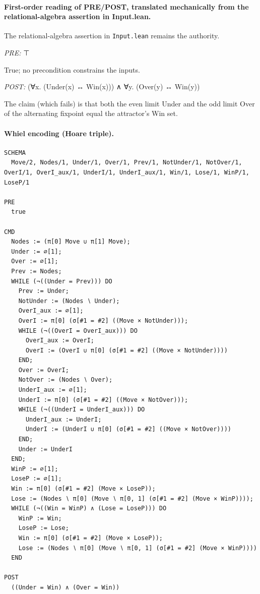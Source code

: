 \documentclass[10pt]{article}
\begin{document}
\paragraph{First-order reading of PRE/POST, translated mechanically from the relational-algebra assertion in Input.lean.} The relational-algebra assertion in \texttt{Input.lean} remains the authority.

\textit{PRE:} ⊤\par True; no precondition constrains the inputs.

\textit{POST:} (∀x. (Under(x) ↔ Win(x))) ∧ ∀y. (Over(y) ↔ Win(y))\par The claim (which fails) is that both the even limit Under and the odd limit Over of the alternating fixpoint equal the attractor's Win set.

\paragraph{Whiel encoding (Hoare triple).}

\begin{Verbatim}[fontsize=\tiny,breaklines=true,breakanywhere=true,frame=single,framesep=1.5mm]
SCHEMA
  Move/2, Nodes/1, Under/1, Over/1, Prev/1, NotUnder/1, NotOver/1, OverI/1, OverI_aux/1, UnderI/1, UnderI_aux/1, Win/1, Lose/1, WinP/1, LoseP/1

PRE
  true 

CMD
  Nodes := (π[0] Move ∪ π[1] Move);
  Under := ∅[1];
  Over := ∅[1];
  Prev := Nodes;
  WHILE (¬((Under = Prev))) DO
    Prev := Under;
    NotUnder := (Nodes ∖ Under);
    OverI_aux := ∅[1];
    OverI := π[0] (σ[#1 = #2] ((Move × NotUnder)));
    WHILE (¬((OverI = OverI_aux))) DO
      OverI_aux := OverI;
      OverI := (OverI ∪ π[0] (σ[#1 = #2] ((Move × NotUnder))))
    END;
    Over := OverI;
    NotOver := (Nodes ∖ Over);
    UnderI_aux := ∅[1];
    UnderI := π[0] (σ[#1 = #2] ((Move × NotOver)));
    WHILE (¬((UnderI = UnderI_aux))) DO
      UnderI_aux := UnderI;
      UnderI := (UnderI ∪ π[0] (σ[#1 = #2] ((Move × NotOver))))
    END;
    Under := UnderI
  END;
  WinP := ∅[1];
  LoseP := ∅[1];
  Win := π[0] (σ[#1 = #2] (Move × LoseP));
  Lose := (Nodes ∖ π[0] (Move ∖ π[0, 1] (σ[#1 = #2] (Move × WinP))));
  WHILE (¬((Win = WinP) ∧ (Lose = LoseP))) DO
    WinP := Win;
    LoseP := Lose;
    Win := π[0] (σ[#1 = #2] (Move × LoseP));
    Lose := (Nodes ∖ π[0] (Move ∖ π[0, 1] (σ[#1 = #2] (Move × WinP))))
  END

POST
  ((Under = Win) ∧ (Over = Win))
\end{Verbatim}
\end{document}
